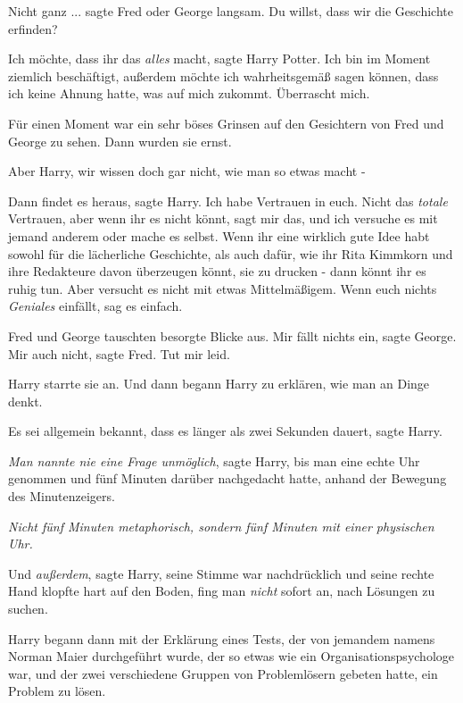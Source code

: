 \glqq{}Nicht ganz ...\grqq{} sagte Fred oder George langsam. \glqq{}Du willst,
dass wir die Geschichte erfinden?\grqq{}

\glqq{}Ich möchte, dass ihr das \emph{alles} macht\grqq{}, sagte Harry Potter.
\glqq{}Ich bin im Moment ziemlich beschäftigt, außerdem möchte ich
wahrheitsgemäß sagen können, dass ich keine Ahnung hatte, was auf mich zukommt.
Überrascht mich.\grqq{}

Für einen Moment war ein sehr böses Grinsen auf den Gesichtern von Fred und
George zu sehen. Dann wurden sie ernst.

\glqq{}Aber Harry, wir wissen doch gar nicht, wie man so etwas macht -\grqq{}

\glqq{}Dann findet es heraus\grqq{}, sagte Harry. \glqq{}Ich habe Vertrauen in
euch. Nicht das \emph{totale} Vertrauen, aber wenn ihr es nicht könnt, sagt mir
das, und ich versuche es mit jemand anderem oder mache es selbst. Wenn ihr eine
wirklich gute Idee habt sowohl für die lächerliche Geschichte, als auch dafür,
wie ihr Rita Kimmkorn und ihre Redakteure davon überzeugen könnt, sie zu drucken
- dann könnt ihr es ruhig tun. Aber versucht es nicht mit etwas Mittelmäßigem.
Wenn euch nichts \emph{Geniales} einfällt, sag es einfach.\grqq{}

Fred und George tauschten besorgte Blicke aus. \glqq{}Mir fällt nichts
ein\grqq{}, sagte George. \glqq{}Mir auch nicht\grqq{}, sagte Fred. \glqq{}Tut
mir leid.\grqq{}

Harry starrte sie an. Und dann begann Harry zu erklären, wie man an Dinge denkt.

Es sei allgemein bekannt, dass es länger als zwei Sekunden dauert, sagte Harry.

\emph{Man nannte nie eine Frage unmöglich}, sagte Harry, bis man eine echte Uhr
genommen und fünf Minuten darüber nachgedacht hatte, anhand der Bewegung des
Minutenzeigers.

\emph{Nicht fünf Minuten metaphorisch, sondern fünf Minuten mit einer physischen
Uhr.}

Und \emph{außerdem}, sagte Harry, seine Stimme war nachdrücklich und seine
rechte Hand klopfte hart auf den Boden, fing man \emph{nicht} sofort an, nach
Lösungen zu suchen.

Harry begann dann mit der Erklärung eines Tests, der von jemandem namens Norman
Maier durchgeführt wurde, der so etwas wie ein Organisationspsychologe war, und
der zwei verschiedene Gruppen von Problemlösern gebeten hatte, ein Problem zu
lösen.

